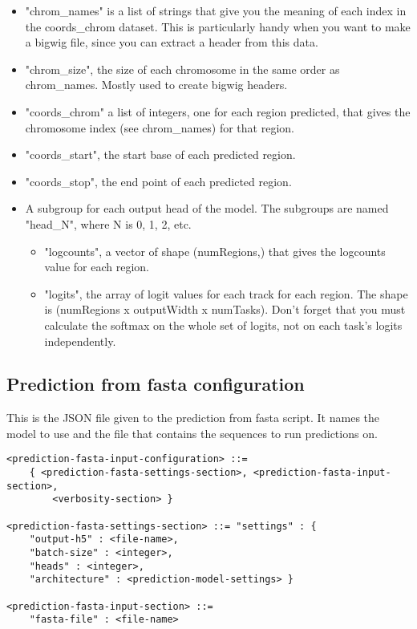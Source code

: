 \documentclass{article}
\begin{document}
\begin{itemize}
    \item "chrom\_names" is a list of strings that give you the meaning of each index in the coords\_chrom dataset. This is particularly handy when you want to make a bigwig file, since you can extract a header from this data. 
    \item "chrom\_size", the size of each chromosome in the same order as chrom\_names. Mostly used to create bigwig headers. 
    \item "coords\_chrom" a list of integers, one for each region predicted, that gives the chromosome index (see chrom\_names) for that region. 
    \item "coords\_start", the start base of each predicted region. 
    \item "coords\_stop", the end point of each predicted region.
    \item A subgroup for each output head of the model. The subgroups are named "head\_N", where N is 0, 1, 2, etc. 
        \begin{itemize}
            \item "logcounts", a vector of shape (numRegions,) that gives the logcounts value for each region. 
            \item "logits", the array of logit values for each track for each region. The shape is (numRegions x outputWidth x numTasks). Don't forget that you must calculate the softmax on the whole set of logits, not on each task's logits independently.
        \end{itemize} 

\end{itemize}

\subsection{Prediction from fasta configuration}
This is the JSON file given to the prediction from fasta script. It names the model to use and the file that contains the sequences to run predictions on.

\begin{lstlisting}
<prediction-fasta-input-configuration> ::=
    { <prediction-fasta-settings-section>, <prediction-fasta-input-section>,
        <verbosity-section> }

<prediction-fasta-settings-section> ::= "settings" : {
    "output-h5" : <file-name>,
    "batch-size" : <integer>,
    "heads" : <integer>,
    "architecture" : <prediction-model-settings> }

<prediction-fasta-input-section> ::=
    "fasta-file" : <file-name>
\end{lstlisting}
\end{document}

